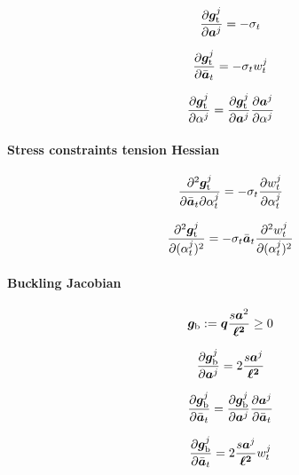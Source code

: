 \begin{equation}
    \frac{\partial\bm{g}_\text{t}^j}{\partial{\bm{a}^j}} = -\sigma_t
\end{equation}

\begin{equation}
    \frac{\partial\bm{g}_\text{t}^j}{\partial\bar{\bm{a}}_t} = -\sigma_t w_t^j
\end{equation}

\begin{equation}
    \frac{\partial\bm{g}_\text{t}^j}{\partial\alpha^j}=\frac{\partial\bm{g}_\text{t}^j}{\partial\bm{a}^j} \frac{\partial\bm{a}^j}{\partial\alpha^j}
\end{equation}

\paragraph*{Stress constraints tension Hessian}

\begin{equation}
    \frac{\partial^2\bm{g}_\text{t}^j}{\partial{\bar{\bm{a}}_t}\partial\alpha_t^j} = -\sigma_t \frac{\partial w_t^j}{\partial\alpha_t^j}
\end{equation}

\begin{equation}
    \frac{\partial^2\bm{g}_\text{t}^j}{\partial(\alpha_t^j)^2} = -\sigma_t  \bar{\bm{a}}_t \frac{\partial^2w_t^j}{\partial(\alpha_t^j)^2}
\end{equation}

\paragraph*{Buckling Jacobian}

\begin{equation}
    \bm{g}_\text{b} := \bm{q}  \frac{s\bm{a}^2}{\bm{\ell^2}} \geq 0
\end{equation}

\begin{equation}
    \frac{\partial\bm{g}_\text{b}^j}{\partial\bm{a}^j} =  2\frac{s\bm{a}^j}{\bm{\ell^2}}
\end{equation}

\begin{equation}
    \frac{\partial\bm{g}_\text{b}^j}{\partial\bar{\bm{a}}_t} = \frac{\partial\bm{g}_\text{b}^j}{\partial{\bm{a}^j}} \frac{\partial\bm{a}^j}{\partial\bar{\bm{a}}_t}
\end{equation}

\begin{equation}
    \frac{\partial\bm{g}_\text{b}^j}{\partial\bar{\bm{a}}_t} =  2\frac{s\bm{a}^j}{\bm{\ell^2}} w_t^j
\end{equation}

